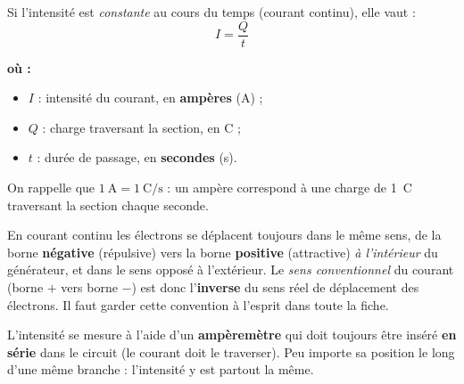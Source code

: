\documentclass[11pt,a4paper]{article}
\newenvironment{ou}{%
  \par\smallskip\noindent\textbf{où :}\nopagebreak
  \begin{itemize}[leftmargin=1.8em,topsep=2pt,itemsep=1.5pt,parsep=0pt]}%
  {\end{itemize}}
\begin{document}
\begin{formule}
Si l'intensité est \emph{constante} au cours du temps (courant continu), elle vaut :
\[ \boxed{\,I = \dfrac{Q}{t}\,} \]
\begin{ou}
  \item $I$ : intensité du courant, en \textbf{ampères} (\si{\ampere}) ;
  \item $Q$ : charge traversant la section, en \si{\coulomb} ;
  \item $t$ : durée de passage, en \textbf{secondes} (\si{\second}).
\end{ou}
On rappelle que $\SI{1}{\ampere}=\SI{1}{\coulomb\per\second}$ : un ampère correspond à une charge de
\SI{1}{\coulomb} traversant la section chaque seconde.
\end{formule}

\begin{remarque}
En courant continu les électrons se déplacent toujours dans le même sens, de la borne \textbf{négative}
(répulsive) vers la borne \textbf{positive} (attractive) \emph{à l'intérieur} du générateur, et dans le
sens opposé à l'extérieur. Le \emph{sens conventionnel} du courant (borne $+$ vers borne $-$) est
donc l'\textbf{inverse} du sens réel de déplacement des électrons. Il faut garder cette convention à
l'esprit dans toute la fiche.
\end{remarque}

\begin{methode}
L'intensité se mesure à l'aide d'un \textbf{ampèremètre} qui doit toujours être inséré \textbf{en
série} dans le circuit (le courant doit le traverser). Peu importe sa position le long d'une même
branche : l'intensité y est partout la même.
\end{methode}
\end{document}
